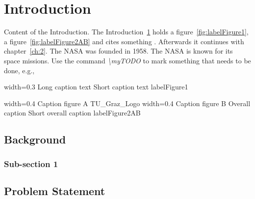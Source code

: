 
\chapter{Introduction}
\label{ch:1}

Content of the Introduction. 
The Introduction~\ref{ch:1} holds a figure~\ref{fig:labelFigure1}, a figure~\ref{fig:labelFigure2AB} and cites something 
.
Afterwards it continues with chapter~\ref{ch:2}.
The \ac{NASA} was founded in 1958. The \ac{NASA} is known for its space missions.
Use the command \textit{\textbackslash myTODO} to mark something that needs to be done, e.g., 


{width=0.3\columnwidth}	%
{Long caption text}		%
{Short caption text}	%
{labelFigure1}			%

{width=0.4\textwidth}		%
{Caption figure A}			%
{TU_Graz_Logo}				%
{width=0.4\textwidth}		%
{Caption figure B}			%
{Overall caption}			%
{Short overall caption}		%
{labelFigure2AB}			%


\section{Background}
\label{sec:section1}
\lipsum[1]


\subsection{Sub-section 1}
\label{sec:sub-section1}
\lipsum[1]


\section{Problem Statement}
\label{sec:problemStatement}
\lipsum[1]



